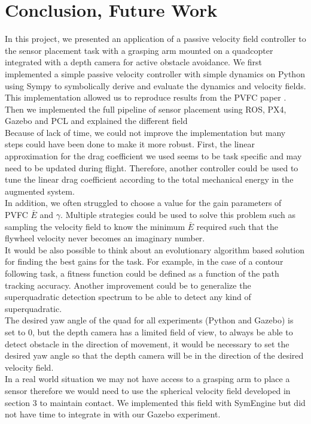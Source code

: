 \section{Conclusion, Future Work}
In this project, we presented an application of a passive velocity field controller to the sensor placement task with a grasping arm mounted on a quadcopter integrated with a depth camera for active obstacle avoidance. 
We first implemented a simple passive velocity controller with simple dynamics on Python using Sympy to symbolically derive and evaluate the dynamics and velocity fields. 
This implementation allowed us to reproduce results from the PVFC paper \cite{li1999passive}.
Then we implemented the full pipeline of sensor placement using ROS, PX4, Gazebo and PCL and explained the different field\\

Because of lack of time, we could not improve the implementation but many steps could have been done to make it more robust.
First, the linear approximation for the drag coefficient we used seems to be task specific and may need to be updated during flight. Therefore, another controller could be used to tune the linear drag coefficient 
according to the total mechanical energy in the augmented system.\\
In addition, we often struggled to choose a value for the gain parameters of PVFC $\bar{E}$ and $\gamma$. Multiple strategies could be used to solve this problem such as sampling the velocity field to know the minimum $\bar{E}$ required 
such that the flywheel velocity never becomes an imaginary number. \\
It would be also possible to think about an evolutionary algorithm based solution for finding the best gains for the task. For example, in the case of a contour following task, a fitness function could be defined as a function of the path tracking accuracy.
Another improvement could be to generalize the superquadratic detection spectrum to be able to detect any kind of superquadratic.\\
The desired yaw angle of the quad for all experiments (Python and Gazebo) is set to 0, but the depth camera has a limited field of view, to always be able to detect obstacle in the direction of movement, it would be necessary to set the desired yaw angle so that the depth camera will be in the direction of the desired velocity field.\\
In a real world situation we may not have access to a grasping arm to place a sensor therefore we would need to use the spherical velocity field developed in section 3 to maintain contact. We implemented this field with SymEngine but did not have time to integrate in with our Gazebo experiment. \\

